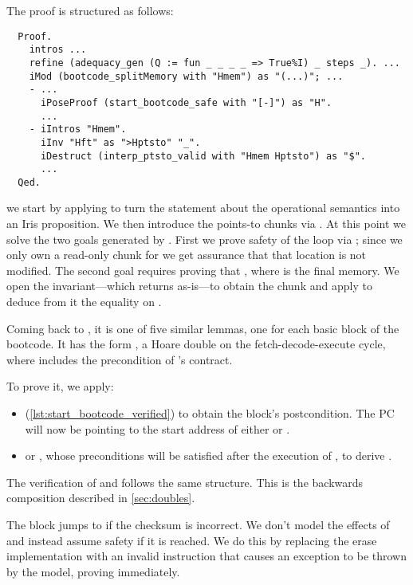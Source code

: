 The proof is structured as follows:
\begin{verbatim}
  Proof.
    intros ...
    refine (adequacy_gen (Q := fun _ _ _ _ => True%I) _ steps _). ...
    iMod (bootcode_splitMemory with "Hmem") as "(...)"; ...
    - ...
      iPoseProof (start_bootcode_safe with "[-]") as "H".
      ...
    - iIntros "Hmem".
      iInv "Hft" as ">Hptsto" "_".
      iDestruct (interp_ptsto_valid with "Hmem Hptsto") as "$".
      ...
  Qed.
\end{verbatim}
we start by applying  to turn the statement about the operational semantics into an Iris proposition. We then introduce the points-to chunks via . At this point we solve the two goals generated by . First we prove safety of the loop via ; since we only own a read-only chunk for  we get assurance that that location is not modified. The second goal requires proving that , where  is the final memory. We open the invariant---which  returns as-is---to obtain the  chunk and apply  to deduce from it the equality on .

Coming back to , it is one of five similar lemmas, one for each basic block of the bootcode. It has the form , \ie a Hoare double on the fetch-decode-execute cycle, where  includes the precondition of 's contract.

To prove it, we apply:
\begin{itemize}
\item {} (\cref{lst:start_bootcode_verified}) to obtain the block's postcondition. The PC will now be pointing to the start address of either  or .
\item {} or , whose preconditions will be satisfied after the execution of , to derive .
\end{itemize}
The verification of  and  follows the same structure. This is the backwards composition described in \cref{sec:doubles}.

The  block jumps to  if the checksum is incorrect. We don't model the effects of  and instead assume safety if it is reached. We do this by replacing the erase implementation with an invalid instruction that causes an exception to be thrown by the model, proving  immediately.

